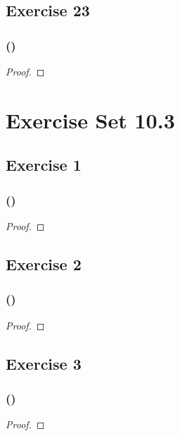 \documentclass[14pt]{extarticle}
\begin{document}
\subsection{Exercise 23}

\subsubsection{()}

\begin{proof}

\end{proof}

\section{Exercise Set 10.3}
\subsection{Exercise 1}

\subsubsection{()}

\begin{proof}

\end{proof}

\subsection{Exercise 2}

\subsubsection{()}

\begin{proof}

\end{proof}

\subsection{Exercise 3}

\subsubsection{()}

\begin{proof}

\end{proof}
\end{document}
